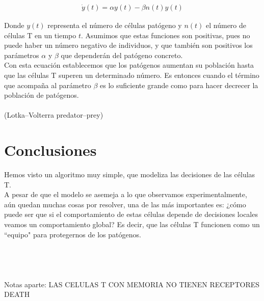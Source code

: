 \documentclass{article}
\begin{document}
	\begin{displaymath}
	\begin{array}{ll}
	\dot{y}(t) = \alpha y(t) - \beta n(t)y(t)
	\end{array}
	\end{displaymath}
	
	Donde $y(t)$ representa el número de células patógeno y $n(t)$ el número de células T en un tiempo $t$. Asumimos que estas funciones son positivas, pues no puede haber un número negativo de individuos, y que también son positivos los parámetros $\alpha$ y $\beta$ que dependerán del patógeno concreto.
	\\
	Con esta ecuación establecemos que los patógenos aumentan su población hasta que las células T superen un determinado número. Es entonces cuando el término que acompaña al parámetro $\beta$ es lo suficiente grande como para hacer decrecer la población de patógenos.
	\\
	\\
	(Lotka–Volterra predator–prey)
	
	\section{Conclusiones}
	Hemos visto un algoritmo muy simple, que modeliza las decisiones de las células T.
	\\
	A pesar de que el modelo se asemeja a lo que observamos experimentalmente, aún quedan muchas cosas por resolver, una de las más importantes es: ¿cómo puede ser que si el comportamiento de estas células depende de decisiones locales veamos un comportamiento global? Es decir, que las células T funcionen como un ``equipo" para protegernos de los patógenos. 
	\\
	\\
	\\
	\\
	\\
	Notas aparte: LAS CELULAS T CON MEMORIA NO TIENEN RECEPTORES DEATH
	
\end{document}
